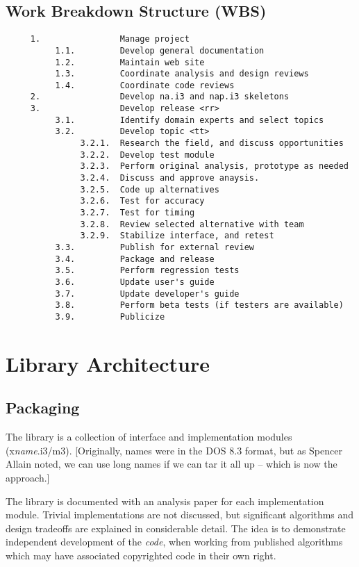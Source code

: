 \subsection{Work Breakdown Structure (WBS)}
\begin{verbatim}
     1.                Manage project
          1.1.         Develop general documentation
          1.2.         Maintain web site
          1.3.         Coordinate analysis and design reviews
          1.4.         Coordinate code reviews
     2.                Develop na.i3 and nap.i3 skeletons
     3.                Develop release <rr>
          3.1.         Identify domain experts and select topics
          3.2.         Develop topic <tt>
               3.2.1.  Research the field, and discuss opportunities
               3.2.2.  Develop test module
               3.2.3.  Perform original analysis, prototype as needed
               3.2.4.  Discuss and approve anaysis.
               3.2.5.  Code up alternatives
               3.2.6.  Test for accuracy
               3.2.7.  Test for timing
               3.2.8.  Review selected alternative with team
               3.2.9.  Stabilize interface, and retest
          3.3.         Publish for external review
          3.4.         Package and release
          3.5.         Perform regression tests
          3.6.         Update user's guide
          3.7.         Update developer's guide
          3.8.         Perform beta tests (if testers are available)
          3.9.         Publicize
\end{verbatim}

\section{Library Architecture}
\subsection{Packaging}
The library is a collection of interface and implementation
modules (x{\it name}.i3/m3).  [Originally, names were in the DOS 8.3
format, but as Spencer Allain noted, we can use long names
if we can tar it all up -- which is now the approach.]

The library is documented with an analysis paper for each
implementation module.  Trivial implementations are not
discussed, but significant algorithms and design tradeoffs
are explained in considerable detail.  The idea is to
demonstrate independent development of the {\em code}, when
working from published algorithms which may have associated
copyrighted code in their own right.

